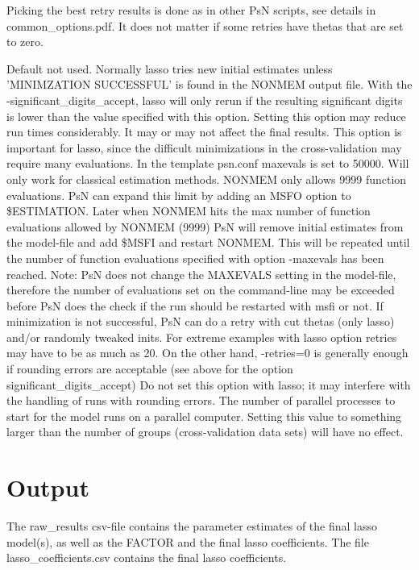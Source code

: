Picking the best retry results is done as in other PsN scripts, see details 
in common\_options.pdf. It does not matter if some retries have thetas that are set to zero.


\begin{optionlist}
Default not used. Normally lasso tries new initial estimates unless 'MINIMZATION SUCCESSFUL' is found in the NONMEM output file. With the -significant\_digits\_accept, lasso will only rerun if the resulting significant digits is lower than the value specified with this option. Setting this option may reduce run times considerably. It may or may not affect the final results. 
\nextopt
{}
This option is important for lasso, since the difficult minimizations in the cross-validation may require many evaluations. In the template psn.conf maxevals is set to 50000. Will only work for classical estimation methods. NONMEM only allows 9999 function evaluations. PsN can expand this limit by adding an MSFO option to \$ESTIMATION. Later when NONMEM hits the max number of function evaluations allowed by NONMEM (9999) PsN will remove initial estimates from the model-file and add \$MSFI and restart NONMEM. This will be repeated until the number of function evaluations specified with option -maxevals has been reached. Note: PsN does not change the MAXEVALS setting in the model-file, therefore the number of evaluations set on the command-line may be exceeded before PsN does the check if the run should be restarted with msfi or not. 
\nextopt
{}
If minimization is not successful, PsN can do a retry with cut thetas (only lasso) and/or randomly tweaked inits. For extreme examples with lasso option retries may have to be as much as 20. On the other hand, -retries=0 is generally enough if rounding errors are acceptable (see above for the option significant\_digits\_accept) 
\nextopt
{}
Do not set this option with lasso; it may interfere with the handling of runs with rounding errors. 
\nextopt
{}
The number of parallel processes to start for the model runs on a parallel computer. Setting this value to something larger than the number of groups (cross-validation data sets) will have no effect. 
\nextopt
\end{optionlist}

\section{Output}
The raw\_results csv-file contains the parameter estimates of the final lasso model(s), as well as the FACTOR and
the final lasso coefficients. The file lasso\_coefficients.csv contains the final lasso coefficients.

